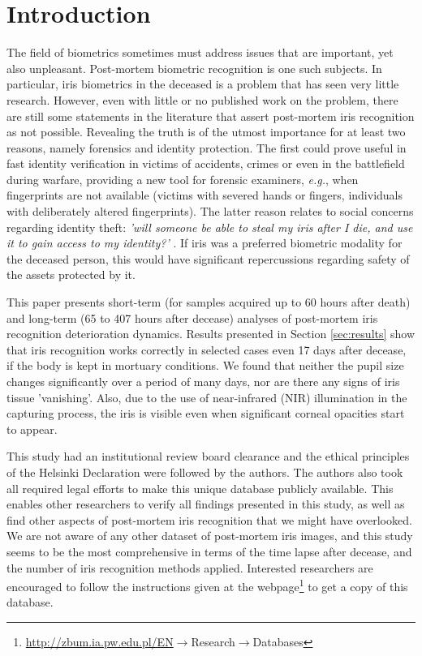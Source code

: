\documentclass[10pt,twocolumn,letterpaper]{article}
\begin{document}
\section{Introduction}
The field of biometrics sometimes must address issues that are important, yet also unpleasant. Post-mortem biometric recognition is one such subjects. In particular, iris biometrics in the deceased is a problem that has seen very little research. However, even with little or no published work on the problem, there are still some statements in the literature that assert post-mortem iris recognition as not possible. Revealing the truth is of the utmost importance for at least two reasons, namely forensics and identity protection. The first could prove useful in fast identity verification in victims of accidents, crimes or even in the battlefield during warfare, providing a new tool for forensic examiners, \emph{e.g.}, when fingerprints are not available (victims with severed hands or fingers, individuals with deliberately altered fingerprints). The latter reason relates to social concerns regarding identity theft: \emph{'will someone be able to steal my iris after I die, and use it to gain access to my identity?'} \cite{ScienceFocusPostMortem}. If iris was a preferred biometric modality for the deceased person, this would have significant repercussions regarding safety of the assets protected by it.

This paper presents short-term (for samples acquired up to 60 hours after death) and long-term (65 to 407 hours after decease) analyses of post-mortem iris recognition deterioration dynamics. Results presented in Section \ref{sec:results} show that iris recognition works correctly in selected cases even 17 days after decease, if the body is kept in mortuary conditions. We found that neither the pupil size changes significantly over a period of many days, nor are there any signs of iris tissue 'vanishing'. Also, due to the use of near-infrared (NIR) illumination in the capturing process, the iris is visible even when significant corneal opacities start to appear.

This study had an institutional review board clearance and the ethical principles of the Helsinki Declaration were followed by the authors. The authors also took all required legal efforts to make this unique database publicly available. This enables other researchers to verify all findings presented in this study, as well as find other aspects of post-mortem iris recognition that we might have overlooked. We are not aware of any other dataset of post-mortem iris images, and this study seems to be the most comprehensive in terms of the time lapse after decease, and the number of iris recognition methods applied. Interested researchers are encouraged to follow the instructions given at the webpage\footnote{\url{http://zbum.ia.pw.edu.pl/EN}$\rightarrow$Research$\rightarrow$Databases} to get a copy of this database.
\end{document}
